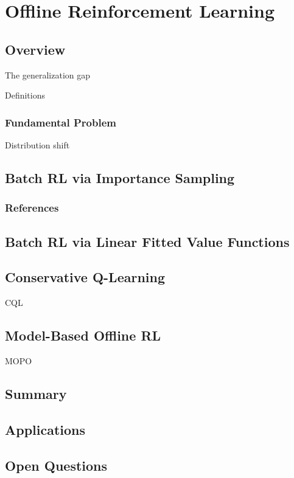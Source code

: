\chapter{Offline Reinforcement Learning}
\todo{}

\section{Overview}

The generalization gap

Definitions

\subsection{Fundamental Problem}
Distribution shift

\section{Batch RL via Importance Sampling}
\subsection{References}

\section{Batch RL via Linear Fitted Value Functions}

\section{Conservative Q-Learning}
\ac{CQL}

\section{Model-Based Offline RL}
\ac{MOPO}

\section{Summary}
\section{Applications}
\section{Open Questions}